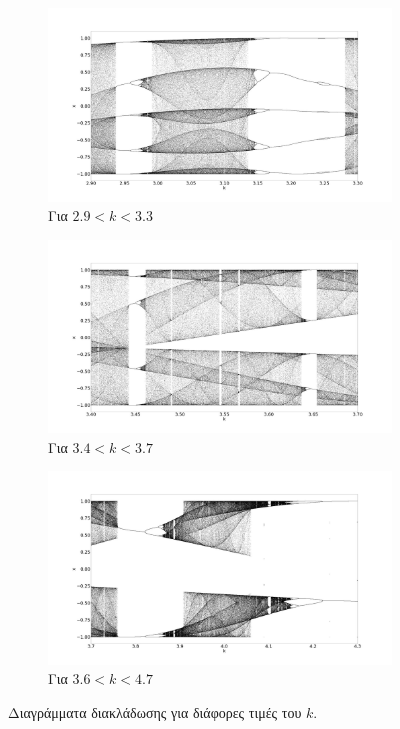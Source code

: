 \begin{figure}[ht]
	\centering
	
	\begin{subfigure}[b]{0.8\textwidth}
		\centering
		\includegraphics[width=\textwidth]{LateX images/cheb q=0.8/g3}
		\caption{Για $2.9<k<3.3$}
		\label{f:g61}
	\end{subfigure}
	\hfill
	\begin{subfigure}[b]{0.8\textwidth}
		\centering
		\includegraphics[width=\textwidth]{LateX images/cheb q=0.8/g4}
		\caption{Για $3.4<k<3.7$}
		\label{f:g62}
	\end{subfigure}
	\hfill
	\begin{subfigure}[b]{0.8\textwidth}
		\centering
		\includegraphics[width=\textwidth]{LateX images/cheb q=0.8/g5}
		\caption{Για $3.6<k<4.7$}
		\label{f:g63}
	\end{subfigure}

	\caption{Διαγράμματα διακλάδωσης για διάφορες τιμές του $k$. }
	\label{f:g64}
\end{figure}

